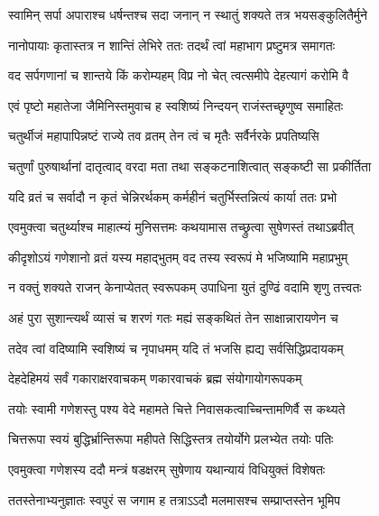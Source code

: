 \twolineshloka
{स्वामिन् सर्पा अपाराश्च धर्षन्तश्च सदा जनान्}
{न स्थातुं शक्यते तत्र भयसङ्कुलितैर्मुने} %

\twolineshloka
{नानोपायाः कृतास्तत्र न शान्तिं लेभिरे ततः}
{तदर्थं त्वां महाभाग प्रष्टुमत्र समागतः} %

\twolineshloka
{वद सर्पगणानां च शान्तये किं करोम्यहम्}
{विप्र नो चेत् त्वत्समीपे देहत्यागं करोमि वै} %


\twolineshloka
{एवं पृष्टो महातेजा जैमिनिस्तमुवाच ह}
{स्वशिष्यं निन्दयन् राजंस्तच्छृणुष्व समाहितः} %


\twolineshloka
{चतुर्थीजं महापापिन्नष्टं राज्ये तव व्रतम्}
{तेन त्वं च मृतैः सर्वैर्नरके प्रपतिष्यसि} %

\twolineshloka
{चतुर्णां पुरुषार्थानां दातृत्वाद् वरदा मता}
{तथा सङ्कटनाशित्वात् सङ्कष्टी सा प्रकीर्तिता} %

\twolineshloka
{यदि व्रतं च सर्वादौ न कृतं चेन्निरर्थकम्}
{कर्महीनं चतुर्भिस्तन्नित्यं कार्या ततः प्रभो} %

\twolineshloka
{एवमुक्त्वा चतुर्थ्याश्च माहात्म्यं मुनिसत्तमः}
{कथयामास तच्छ्रुत्वा सुषेणस्तं तथाऽब्रवीत्} %


\twolineshloka
{कीदृशोऽयं गणेशानो व्रतं यस्य महाद्भुतम्}
{वद तस्य स्वरूपं मे भजिष्यामि महाप्रभुम्} %


\twolineshloka
{न वक्तुं शक्यते राजन् केनाप्येतत् स्वरूपकम्}
{उपाधिना युतं दुण्ढिं वदामि श‍ृणु तत्त्वतः} %

\twolineshloka
{अहं पुरा सुशान्त्यर्थं व्यासं च शरणं गतः}
{मह्यं सङ्कथितं तेन साक्षान्नारायणेन च} %

\twolineshloka
{तदेव त्वां वदिष्यामि स्वशिष्यं च नृपाधमम्}
{यदि तं भजसि ह्यद्य सर्वसिद्धिप्रदायकम्} %

\twolineshloka
{देहदेहिमयं सर्वं गकाराक्षरवाचकम्}
{णकारवाचकं ब्रह्म संयोगायोगरूपकम्} %

\twolineshloka
{तयोः स्वामी गणेशस्तु पश्य वेदे महामते}
{चित्ते निवासकत्वाच्चिन्तामणिर्वै स कथ्यते} %

\twolineshloka
{चित्तरूपा स्वयं बुद्धिर्भ्रान्तिरूपा महीपते}
{सिद्धिस्तत्र तयोर्योगे प्रलभ्येत तयोः पतिः} %

\twolineshloka
{एवमुक्त्वा गणेशस्य ददौ मन्त्रं षडक्षरम्}
{सुषेणाय यथान्यायं विधियुक्तं विशेषतः} %

\twolineshloka
{ततस्तेनाभ्यनुज्ञातः स्वपुरं स जगाम ह}
{तत्राऽऽदौ मलमासश्च सम्प्राप्तस्तेन भूमिप} %

